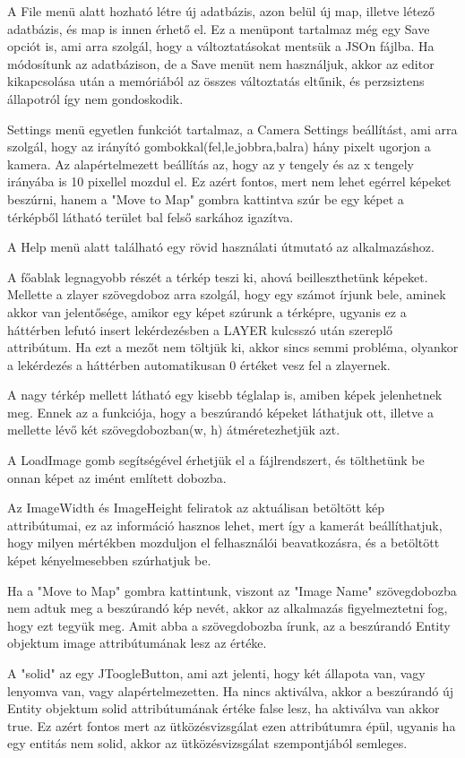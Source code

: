 A File menü alatt hozható létre új adatbázis, azon belül új map, illetve létező adatbázis, és map is innen érhető el. Ez a menüpont tartalmaz még egy Save opciót is, ami arra szolgál, hogy a változtatásokat mentsük a JSOn fájlba. Ha módosítunk az adatbázison, de a Save menüt nem használjuk, akkor az editor kikapcsolása után a memóriából az összes változtatás eltűnik, és perzsiztens állapotról így nem gondoskodik.

Settings menü egyetlen funkciót tartalmaz, a Camera Settings beállítást, ami arra szolgál, hogy az irányító gombokkal(fel,le,jobbra,balra) hány pixelt ugorjon a kamera. Az alapértelmezett beállítás az, hogy az y tengely és az x tengely irányába is 10 pixellel mozdul el.
Ez azért fontos, mert nem lehet egérrel képeket beszúrni, hanem a "Move to Map" gombra kattintva szúr be egy képet a térképből látható terület bal felső sarkához igazítva. 

A Help menü alatt található egy rövid használati útmutató az alkalmazáshoz.

A főablak legnagyobb részét a térkép teszi ki, ahová beilleszthetünk képeket. Mellette a zlayer szövegdoboz arra szolgál, hogy egy számot írjunk bele, aminek akkor van jelentősége, amikor egy képet szúrunk a térképre, ugyanis ez a háttérben lefutó insert lekérdezésben a LAYER kulcsszó után szereplő attribútum. Ha ezt a mezőt nem töltjük ki, akkor sincs semmi probléma, olyankor a lekérdezés a háttérben automatikusan 0 értéket vesz fel a zlayernek.

A nagy térkép mellett látható egy kisebb téglalap is, amiben képek jelenhetnek meg. Ennek az a funkciója, hogy a beszúrandó képeket láthatjuk ott, illetve a mellette lévő két szövegdobozban(w, h) átméretezhetjük azt. 

A LoadImage gomb segítségével érhetjük el a fájlrendszert, és tölthetünk be onnan képet az imént említett dobozba.

Az ImageWidth és ImageHeight feliratok az aktuálisan betöltött kép attribútumai, ez az információ hasznos lehet, mert így a kamerát beállíthatjuk, hogy milyen mértékben mozduljon el felhasználói beavatkozásra, és a betöltött képet kényelmesebben szúrhatjuk be.

Ha a "Move to Map" gombra kattintunk, viszont az "Image Name" szövegdobozba nem adtuk meg a beszúrandó kép nevét, akkor az alkalmazás figyelmeztetni fog, hogy ezt tegyük meg. Amit abba a szövegdobozba írunk, az a beszúrandó Entity objektum image attribútumának lesz az értéke. 

A "solid" az egy JToogleButton, ami azt jelenti, hogy két állapota van, vagy lenyomva van, vagy alapértelmezetten. Ha nincs aktiválva, akkor a beszúrandó új Entity objektum solid attribútumának értéke false lesz, ha aktiválva van akkor true. Ez azért fontos mert az ütközésvizsgálat ezen attribútumra épül, ugyanis ha egy entitás nem solid, akkor az ütközésvizsgálat szempontjából semleges.

